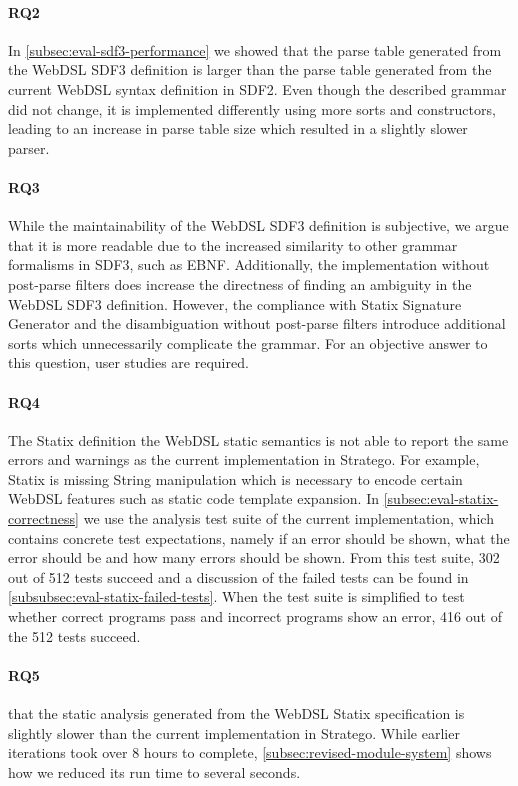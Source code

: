     \paragraph{RQ2} In \cref{subsec:eval-sdf3-performance} we showed that the parse table generated from the WebDSL SDF3 definition is larger than the parse table generated from the current WebDSL syntax definition in SDF2. Even though the described grammar did not change, it is implemented differently using more sorts and constructors, leading to an increase in parse table size which resulted in a slightly slower parser.

    \paragraph{RQ3} While the maintainability of the WebDSL SDF3 definition is subjective, we argue that it is more readable due to the increased similarity to other grammar formalisms in SDF3, such as EBNF. Additionally, the implementation without post-parse filters does increase the directness of finding an ambiguity in the WebDSL SDF3 definition. However, the compliance with Statix Signature Generator and the disambiguation without post-parse filters introduce additional sorts which unnecessarily complicate the grammar. For an objective answer to this question, user studies are required.

    \paragraph{RQ4} The Statix definition the WebDSL static semantics is not able to report the same errors and warnings as the current implementation in Stratego. For example, Statix is missing String manipulation which is necessary to encode certain WebDSL features such as static code template expansion. In \cref{subsec:eval-statix-correctness} we use the analysis test suite of the current implementation, which contains concrete test expectations, namely if an error should be shown, what the error should be and how many errors should be shown. From this test suite, 302 out of 512 tests succeed and a discussion of the failed tests can be found in \cref{subsubsec:eval-statix-failed-tests}. When the test suite is simplified to test whether correct programs pass and incorrect programs show an error, 416 out of the 512 tests succeed.

    \paragraph{RQ5}  that the static analysis generated from the WebDSL Statix specification is slightly slower than the current implementation in Stratego. While earlier iterations took over 8 hours to complete, \cref{subsec:revised-module-system} shows how we reduced its run time to several seconds.
    
